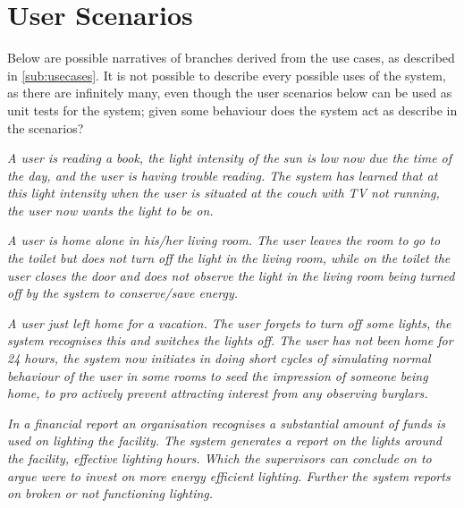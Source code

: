 \section{User Scenarios}\label{sub:userscenarios}

Below are possible narratives of branches derived from the use cases, as described in \cref{sub:usecases}. It is not possible to describe every possible uses of the system, as there are infinitely many, even though the user scenarios below can be used as unit tests for the system; given some behaviour does the system act as describe in the scenarios?

\textit{A user is reading a book, the light intensity of the sun is low now due the time of the day, and the user is having trouble reading. The system has learned that at this light intensity when the user is situated at the couch with TV not running, the user now wants the light to be on.}

\textit{A user is home alone in his/her living room. The user leaves the room to go to the toilet but does not turn off the light in the living room, while on the toilet the user closes the door and does not observe the light in the living room being turned off by the system to conserve/save energy.}

\textit{A user just left home for a vacation. The user forgets to turn off some lights, the system recognises this and switches the lights off. The user has not been home for 24 hours, the system now initiates in doing short cycles of simulating normal behaviour of the user in some rooms to seed the impression of someone being home, to pro actively prevent attracting interest from any observing burglars.} 

\textit{In a financial report an organisation recognises a substantial amount of funds is used on lighting the facility. The system generates a report on the lights around the facility, effective lighting hours. Which the supervisors can conclude on to argue were to invest on more energy efficient lighting. Further the system reports on broken or not functioning lighting.} 

